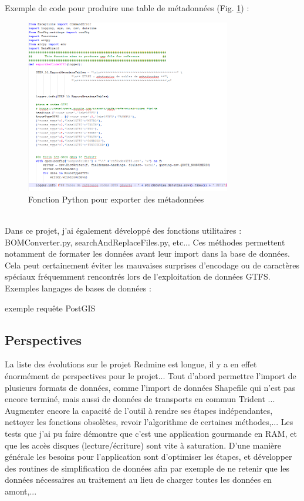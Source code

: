\begin{itemize}
Exemple de code pour produire une table de métadonnées (Fig. \ref{CodeMetadata}) :
\\
\begin{figure}[h]
	\centering
		\includegraphics[width=0.8\textwidth]{images/DW_Fonction_Python.PNG}
	\caption{Fonction Python pour exporter des métadonnées}
	\label{CodeMetadata}
\end{figure}\\

Dans ce projet, j'ai également développé des fonctions utilitaires : BOMConverter.py, searchAndReplaceFiles.py, etc... Ces méthodes permettent notamment de formater les données avant leur import dans la base de données. Cela peut certainement éviter les mauvaises surprises d'encodage ou de caractères spéciaux fréquemment rencontrés lors de l'exploitation de données GTFS.\\




Exemples langages de bases de données :

exemple requête PostGIS




\subsection{Perspectives}

La liste des évolutions sur le projet Redmine est longue, il y a en effet énormément de perspectives pour le projet... Tout d'abord permettre l'import de plusieurs formats de données, comme l'import de données \og Shapefile \fg qui n'est pas encore terminé, mais aussi de données de transports en commun \og Trident \fg... Augmenter encore la capacité de l'outil à rendre ses étapes indépendantes, nettoyer les fonctions obsolètes, revoir l'algorithme de certaines méthodes,...
Les tests que j'ai pu faire démontre que c'est une application gourmande en RAM, et que les accès disques (lecture/écriture) sont vite à saturation. D'une manière générale les besoins pour l'application sont d'optimiser les étapes, et développer des routines de simplification de données afin par exemple de ne retenir que les données nécessaires au traitement au lieu de charger toutes les données en amont,... \\



\end{itemize}
